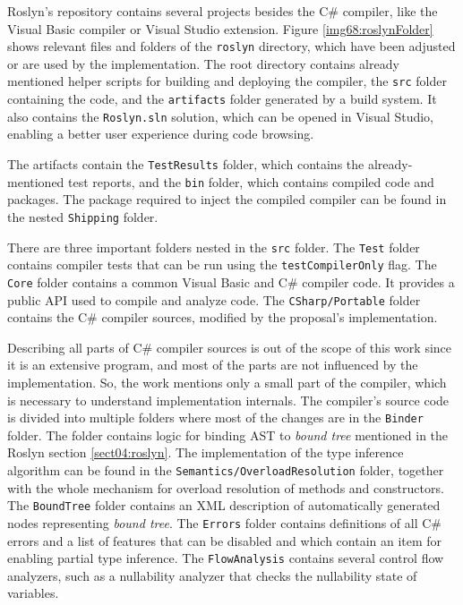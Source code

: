 Roslyn’s repository contains several projects besides the C\# compiler, like the Visual Basic compiler or Visual Studio extension. 
Figure \ref{img68:roslynFolder} shows relevant files and folders of the \texttt{roslyn} directory, which have been adjusted or are used by the implementation. 
The root directory contains already mentioned helper scripts for building and deploying the compiler, the \texttt{src} folder containing the code, and the \texttt{artifacts} folder generated by a build system.
It also contains the \texttt{Roslyn.sln} solution, which can be opened in Visual Studio, enabling a better user experience during code browsing.
\par
The artifacts contain the \texttt{TestResults} folder, which contains the already-mentioned test reports, and the \texttt{bin} folder, which contains compiled code and packages. 
The package required to inject the compiled compiler can be found in the nested \texttt{Shipping} folder.
\par
There are three important folders nested in the \texttt{src} folder. 
The \texttt{Test} folder contains compiler tests that can be run using the \texttt{testCompilerOnly} flag. 
The \texttt{Core} folder contains a common Visual Basic and C\# compiler code. 
It provides a public API used to compile and analyze code. 
The \texttt{CSharp/Portable} folder contains the C\# compiler sources, modified by the proposal’s implementation.
\par
Describing all parts of C\# compiler sources is out of the scope of this work since it is an extensive program, and most of the parts are not influenced by the implementation. 
So, the work mentions only a small part of the compiler, which is necessary to understand implementation internals. 
The compiler’s source code is divided into multiple folders where most of the changes are in the \texttt{Binder} folder. 
The folder contains logic for binding \ac{AST} to \textit{bound tree} mentioned in the Roslyn section \ref{sect04:roslyn}. 
The implementation of the type inference algorithm can be found in the \texttt{Semantics/OverloadResolution} folder, together with the whole mechanism for overload resolution of methods and constructors. 
The \texttt{BoundTree} folder contains an XML description of automatically generated nodes representing \textit{bound tree}. 
The \texttt{Errors} folder contains definitions of all C\# errors and a list of features that can be disabled and which contain an item for enabling partial type inference. 
The \texttt{FlowAnalysis} contains several control flow analyzers, such as a nullability analyzer that checks the nullability state of variables. 
